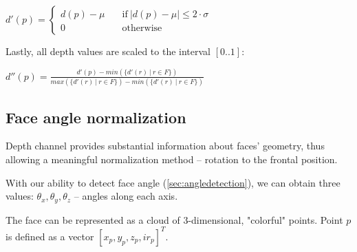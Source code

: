         \begin{center}
        $
          d'(p) = \begin{cases}
                  d(p) - \mu &\quad\text{if}\ |d(p) - \mu| \leqslant 2 \cdot \sigma \\
                  0 &\quad\text{otherwise}
                  \end{cases}
        $
        \end{center}
        Lastly, all depth values are scaled to the interval $[0..1]$:
        \begin{center}
        $
          d''(p) = \frac{d'(p) - min(\{d'(r)\ |\ r \in F\})}{max(\{d'(r)\ |\ r \in F\}) - min(\{d'(r)\ |\ r \in F\})}
        $
        \end{center}

        \subsection*{Face angle normalization}
        Depth channel provides substantial information about faces' geometry, thus allowing
        a meaningful normalization method -- rotation to the frontal position.

        With our ability to detect face angle (\ref{sec:angledetection}), we can obtain
        three values: $\theta_x, \theta_y, \theta_z$ -- angles along each axis.

        The face can be represented as a cloud of $3$-dimensional, "colorful" points.
        Point $p$ is defined as a vector $[x_p, y_p, z_p, ir_p]^{T}$.

